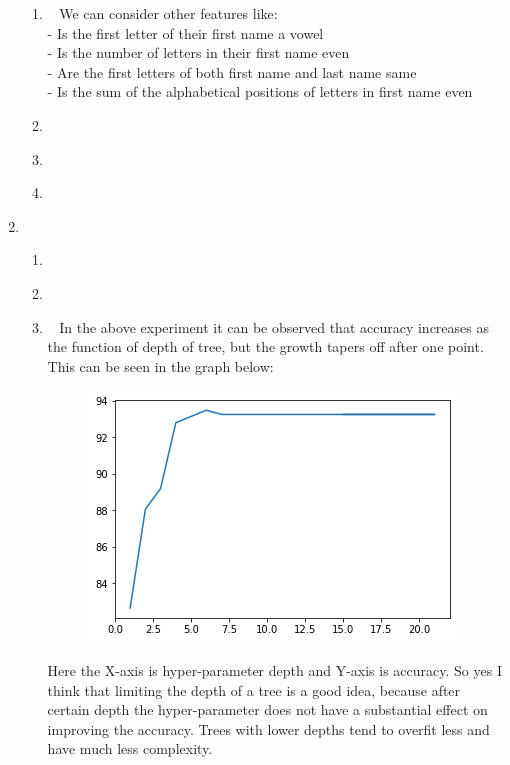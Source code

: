 \begin{enumerate}
\begin{enumerate}
        \item~ We can consider other features like:\\
        - Is the first letter of their first name a vowel\\
        - Is the number of letters in their first name even\\
        - Are the first letters of both first name and last name same\\
        - Is the sum of the alphabetical positions of letters in first name even     
        
        \item~
        \item~
        \item~
        
    \end{enumerate}
    \item~
        \begin{enumerate}
            \item~
            \item~
            \item~ In the above experiment it can be observed that accuracy increases as the function of depth of tree, but the growth tapers off after one point.\\ This can be seen in the graph below:\\
            \begin{figure}[h!]
            	\includegraphics{plot.png}
            \end{figure}
            Here the X-axis is hyper-parameter depth and Y-axis is accuracy.
            So yes I think that limiting the depth of a tree is a good idea, because after certain depth the hyper-parameter does not have a substantial effect on improving the accuracy. Trees with lower depths tend to overfit less and have much less complexity.
        \end{enumerate}

\end{enumerate}

